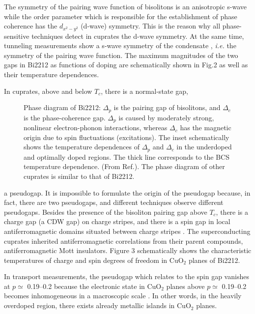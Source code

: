 The symmetry of the pairing wave function of bisolitons is an 
anisotropic s-wave 
while the order parameter which is responsible for the establishment of 
phase coherence has the $d_{x^{2}-y^{2}}$ (d-wave) symmetry. This is the 
reason why all phase-sensitive techniques detect in cuprates the d-wave 
symmetry. At the same time, tunneling measurements show a s-wave 
symmetry of the condensate \cite{Klemm}, {\em i.e.} the symmetry of the 
pairing wave function. The maximum magnitudes of the two gaps in Bi2212 
as functions of doping are schematically shown in Fig.2 as well as their 
temperature dependences.

In cuprates, above and below $T_{c}$, there is a normal-state gap, 
\begin{figure}[t]
\leftskip-10pt
\columnwidth
\centerline{}
\vspace{2mm}
\caption{Phase diagram of Bi2212: $\Delta _{p}$ is the pairing gap of 
bisolitons, and $\Delta _{c}$ is the phase-coherence gap. $\Delta _{p}$
is caused by moderately strong, nonlinear electron-phonon interactions, 
whereas $\Delta _{c}$ has the magnetic origin due to spin fluctuations 
(excitations). The inset schematically shows the temperature dependences 
of $\Delta _{p}$ and $\Delta _{c}$ in the underdoped and optimally doped 
regions. The thick line corresponds to the BCS temperature 
dependence. (From Ref.\protect\cite{AMour3}). The phase diagram of other 
cuprates is similar to that of Bi2212.}
\label{fig2}
\end{figure}
a pseudogap. It is impossible to formulate the origin of 
the pseudogap because, in fact, there are two pseudogaps, and different 
techniques observe different pseudogaps. Besides the presence of the 
bisoliton pairing gap above $T_{c}$, there is a charge gap (a CDW gap) on 
charge stripes, and there is a spin gap in local antiferromagnetic domains 
situated between charge stripes \cite{Zaanen,Millis}. The 
superconducting cuprates inherited antiferromagnetic correlations from 
their parent compounds, antiferromagnetic Mott insulators. Figure 3 
schematically shows the characteristic temperatures 
of charge and spin degrees of freedom in CuO$_{2}$ planes of Bi2212.

In transport measurements, the pseudogap which relates to the spin gap 
\cite{Mochalk} vanishes at $p \simeq$ 0.19--0.2 \cite{Wuts} because the 
electronic state in CuO$_{2}$ planes above $p \simeq$ 0.19--0.2 becomes 
inhomogeneous in a macroscopic scale \cite{Wen}. In other words, in the 
heavily overdoped region, there exists already metallic islands in 
CuO$_{2}$ planes.


